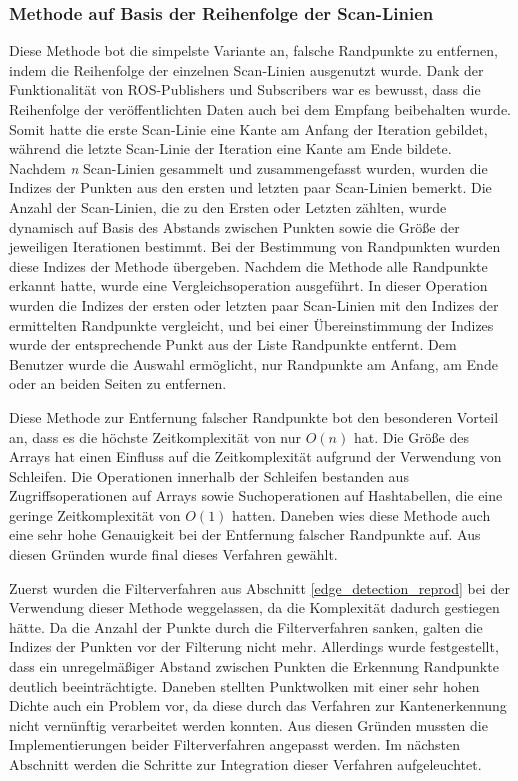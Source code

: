 \subsubsection{Methode auf Basis der Reihenfolge der Scan-Linien}
Diese Methode bot die simpelste Variante an, falsche Randpunkte zu entfernen, indem die Reihenfolge der einzelnen Scan-Linien ausgenutzt wurde. Dank der Funktionalität von ROS-Publishers und Subscribers war es bewusst, dass die Reihenfolge der veröffentlichten Daten auch bei dem Empfang beibehalten wurde. Somit hatte die erste Scan-Linie eine Kante am Anfang der Iteration gebildet, während die letzte Scan-Linie der Iteration eine Kante am Ende bildete. Nachdem \textit{n} Scan-Linien gesammelt und zusammengefasst wurden, wurden die Indizes der Punkten aus den ersten und letzten paar Scan-Linien bemerkt. Die Anzahl der Scan-Linien, die zu den Ersten oder Letzten zählten, wurde dynamisch auf Basis des Abstands zwischen Punkten sowie die Größe der jeweiligen Iterationen bestimmt. Bei der Bestimmung von Randpunkten wurden diese Indizes der Methode übergeben. Nachdem die Methode alle Randpunkte erkannt hatte, wurde eine Vergleichsoperation ausgeführt. In dieser Operation wurden die Indizes der ersten oder letzten paar Scan-Linien mit den Indizes der ermittelten Randpunkte vergleicht, und bei einer Übereinstimmung der Indizes wurde der entsprechende Punkt aus der Liste Randpunkte entfernt. Dem Benutzer wurde die Auswahl ermöglicht, nur Randpunkte am Anfang, am Ende oder an beiden Seiten zu entfernen.

Diese Methode zur Entfernung falscher Randpunkte bot den besonderen Vorteil an, dass es die höchste Zeitkomplexität von nur $O(n)$ hat. Die Größe des Arrays hat einen Einfluss auf die Zeitkomplexität aufgrund der Verwendung von Schleifen. Die Operationen innerhalb der Schleifen bestanden aus Zugriffsoperationen auf Arrays sowie Suchoperationen auf Hashtabellen, die eine geringe Zeitkomplexität von $O(1)$ hatten. Daneben wies diese Methode auch eine sehr hohe Genauigkeit bei der Entfernung falscher Randpunkte auf. Aus diesen Gründen wurde final dieses Verfahren gewählt.

Zuerst wurden die Filterverfahren aus Abschnitt \ref{edge_detection_reprod} bei der Verwendung dieser Methode weggelassen, da die Komplexität dadurch gestiegen hätte. Da die Anzahl der Punkte durch die Filterverfahren sanken, galten die Indizes der Punkten vor der Filterung nicht mehr. Allerdings wurde festgestellt, dass ein unregelmäßiger Abstand zwischen Punkten die Erkennung Randpunkte deutlich beeinträchtigte. Daneben stellten Punktwolken mit einer sehr hohen Dichte auch ein Problem vor, da diese durch das Verfahren zur Kantenerkennung nicht vernünftig verarbeitet werden konnten. Aus diesen Gründen mussten die Implementierungen beider Filterverfahren angepasst werden. Im nächsten Abschnitt werden die Schritte zur Integration dieser Verfahren aufgeleuchtet. 

